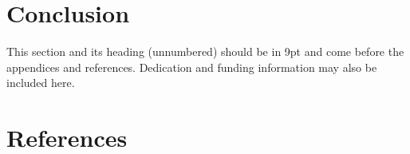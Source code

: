 \documentclass[twocolumn]{rps-esrel2022}
\begin{document}
\section{Conclusion}

\begin{acknowledgement}
This section and its heading (unnumbered) should be in 9pt and come before the appendices and references.  Dedication and funding information may also be included here. 

\section*{References}



\end{acknowledgement}
\end{document}
